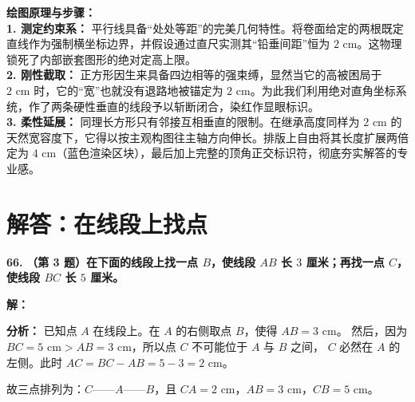 \vspace{0.4cm}
{\small\color{blue!70!black}
\textbf{绘图原理与步骤：}\\
\textbf{1. 测定约束系：} 平行线具备“处处等距”的完美几何特性。将卷面给定的两根既定直线作为强制横坐标边界，并假设通过直尺实测其“铅垂间距”恒为 $2\text{ cm}$。这物理锁死了内部嵌套图形的绝对定高上限。\\
\textbf{2. 刚性截取：} 正方形因生来具备四边相等的强束缚，显然当它的高被困局于 $2\text{ cm}$ 时，它的“宽”也就没有退路地被锚定为 $2\text{ cm}$。为此我们利用绝对直角坐标系统，作了两条硬性垂直的线段予以斩断闭合，染红作显眼标识。\\
\textbf{3. 柔性延展：} 同理长方形只有邻接互相垂直的限制。在继承高度同样为 $2\text{ cm}$ 的天然宽容度下，它得以按主观构图往主轴方向伸长。排版上自由将其长度扩展两倍定为 $4\text{ cm}$（蓝色渲染区块），最后加上完整的顶角正交标识符，彻底夯实解答的专业感。
}

\newpage


\section{解答：在线段上找点}

\vspace{0.6cm}

\textbf{\LARGE 66.} \textbf{（第 3 题）在下面的线段上找一点 $B$，使线段 $AB$ 长 $3$ 厘米；再找一点 $C$，使线段 $BC$ 长 $5$ 厘米。}

\vspace{0.4cm}
\textbf{解：}

\vspace{0.2cm}
\textbf{分析：} 已知点 $A$ 在线段上。在 $A$ 的右侧取点 $B$，使得 $AB = 3\text{ cm}$。
然后，因为 $BC = 5\text{ cm} > AB = 3\text{ cm}$，所以点 $C$ 不可能位于 $A$ 与 $B$ 之间，
$C$ 必然在 $A$ 的左侧。此时 $AC = BC - AB = 5 - 3 = 2\text{ cm}$。

故三点排列为：$C$——$A$——$B$，且 $CA = 2\text{ cm}$，$AB = 3\text{ cm}$，$CB = 5\text{ cm}$。

\vspace{0.4cm}

\begin{center}
\end{center}

